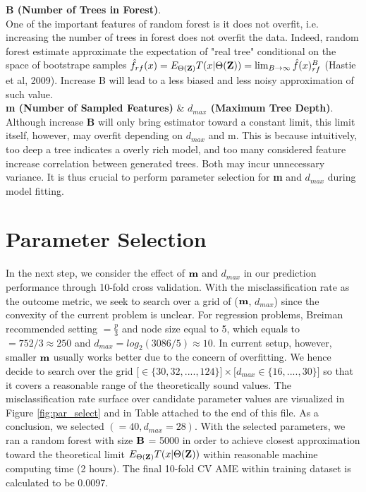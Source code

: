 \documentclass[11pt]{article}
\theoremstyle{definition}
\begin{document}
\textbf{B (Number of Trees in Forest)}. \\
One of the important features of random forest is it does not overfit, i.e. increasing the number of trees in forest does not overfit the data. Indeed, random forest estimate approximate the expectation of "real tree" conditional on the space of bootstrape samples $\hat{f}_{rf}(x) = E_{\Theta({\bf Z})}T(x|\Theta({\bf Z})) = \lim_{B \rightarrow \infty} \hat{f}(x)_{rf}^B$ (Hastie et al, 2009). Increase B will lead to a less biased and less noisy approximation of such value.\\

\textbf{m (Number of Sampled Features)} \& \textbf{$d_{max}$ (Maximum Tree Depth)}. \\
Although increase \textbf{B} will only bring estimator toward a constant limit, this limit itself, however, may overfit depending on $d_{max}$ and m. This is because intuitively, too deep a tree indicates a overly rich model, and too many considered feature increase correlation between generated trees. Both may incur unnecessary variance. It is thus crucial to perform parameter selection for \textbf{m} and \textbf{$d_{max}$} during model fitting.

\section{\textbf{Parameter Selection}}

In the next step, we consider the effect of ${\bf m}$ and $d_{max}$ in our prediction performance through 10-fold cross validation. With the  misclassification rate as the outcome metric, we seek to search over a grid of (${\bf m}$, $d_{max}$) since the convexity of the current problem is unclear. For regression problems, Breiman recommended setting $\bm = \frac{p}{3}$ and node size equal to 5, which equals to $\bm = 752/3 \approx 250$ and $d_{max} = log_2(3086/5) \approx 10$. In current setup, however, smaller ${\bf m}$ usually works better due to the concern of overfitting. We hence decide to search over the grid $\big[ \bm \in \{30, 32, ...., 124\} \big] \times \big[ d_{max} \in \{16, ...., 30\} \big]$ so that it covers a reasonable range of the theoretically sound values. The misclassification rate surface over candidate parameter values are visualized in Figure \ref{fig:par_select} and in Table attached to the end of this file. As a conclusion, we selected $(\bm = 40, d_{max} = 28)$. With the selected parameters, we ran a random forest with size ${\bf B}$ = 5000 in order to achieve closest approximation toward the theoretical limit $E_{\Theta({\bf Z})}T(x|\Theta({\bf Z}))$ within reasonable machine computing time (2 hours). The final 10-fold CV AME within training dataset is calculated to be 0.0097.
\end{document}
